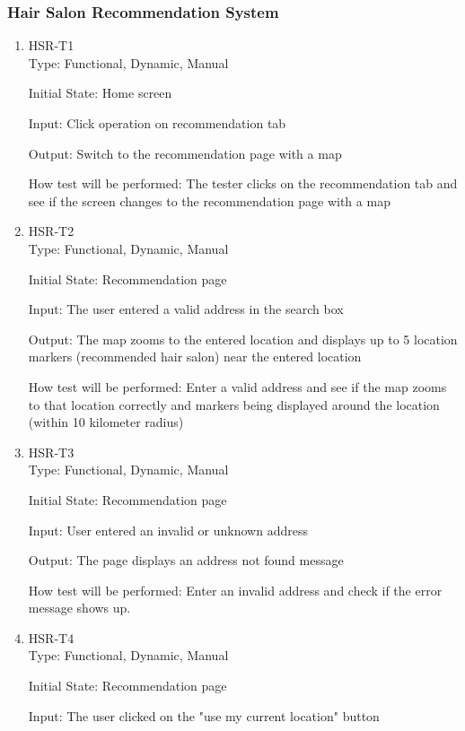 \documentclass[12pt, titlepage]{article}
\begin{document}
\subsubsection{Hair Salon Recommendation System}
\begin{enumerate}
\item{HSR-T1}\\
Type: Functional, Dynamic, Manual
					
Initial State: Home screen
					
Input: Click operation on recommendation tab
					
Output: Switch to the recommendation page with a map
					
How test will be performed: The tester clicks on the recommendation tab and see if the screen changes to the recommendation page with a map
				
\item{HSR-T2}\\
Type: Functional, Dynamic, Manual
					
Initial State: Recommendation page
					
Input: The user entered a valid address in the search box
					
Output: The map zooms to the entered location and displays up to 5 location markers (recommended hair salon) near the entered location
					
How test will be performed: Enter a valid address and see if the map zooms to that location correctly and markers being displayed around the location (within 10 kilometer radius)

\item{HSR-T3}\\
Type: Functional, Dynamic, Manual
					
Initial State: Recommendation page
					
Input: User entered an invalid or unknown address
					
Output: The page displays an address not found message
					
How test will be performed: Enter an invalid address and check if the error message shows up.

\item{HSR-T4}\\
Type: Functional, Dynamic, Manual
					
Initial State: Recommendation page
					
Input: The user clicked on the "use my current location" button
					

\end{enumerate}
\end{document}
